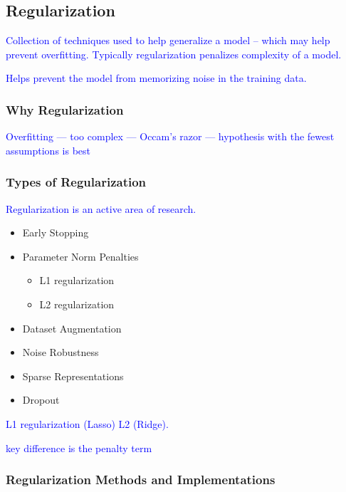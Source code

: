 \subsection{Regularization}


\textcolor{blue}{Collection of techniques used to help generalize a model -- which may help prevent overfitting. Typically regularization penalizes complexity of a model.}


\textcolor{blue}{Helps prevent the model from memorizing noise in the training data.}


\subsubsection{Why Regularization}

\textcolor{blue}{Overfitting --- too complex --- Occam's razor --- hypothesis with the fewest assumptions is best}


\subsubsection{Types of Regularization}

\textcolor{blue}{Regularization is an active area of research.}

\begin{itemize}
	\item Early Stopping
	\item Parameter Norm Penalties
	\begin{itemize}
		\item L1 regularization
		\item L2 regularization
	\end{itemize}
	\item Dataset Augmentation
	\item Noise Robustness
	\item Sparse Representations
	\item Dropout
\end{itemize}


\textcolor{blue}{L1 regularization (Lasso) L2 (Ridge).}

\textcolor{blue}{key difference is the penalty term}


\subsubsection{Regularization Methods and Implementations}

